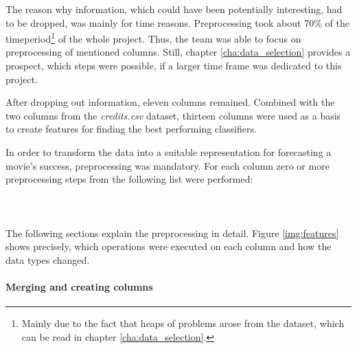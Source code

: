 The reason why information, which could have been potentially interesting, had to be dropped, was mainly for time reasons. Preprocessing took about 70\% of the timeperiod\footnote{Mainly due to the fact that heaps of problems arose from the dataset, which can be read in chapter \ref{cha:data_selection}.} of the whole project. Thus, the team was able to focus on preprocessing of mentioned columns. Still, chapter \ref{cha:data_selection} provides a prospect, which steps were possible, if a larger time frame was dedicated to this project.

After dropping out information, eleven columns remained. Combined with the two columns from the \textit{credits.csv} dataset, thirteen columns were used as a basis to create features for finding the best performing classifiers.

In order to transform the data into a suitable representation for forecasting a movie's success, preprocessing was mandatory. For each column zero or more preprocessing steps from the following list were performed:
\\ \\
\\ \\
The following sections explain the preprocessing in detail. Figure \ref{img:features} shows precisely, which operations were executed on each column and how the data types changed.


\paragraph{Merging and creating columns}
\label{sec:merge_create}



